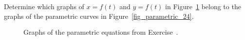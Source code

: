 
\begin{Exercise}[difficulty = 2, label = oef_match_graphs_par_eq_curves_opl] Determine which graphs of $x=f(t)$ and $y=f(t)$ in Figure~\ref{fig_parametric_23} belong to the graphs of the parametric curves in Figure~\ref{fig_parametric_24}. \label{oef_match_graphs_par_eq_curves}
    \begin{figure}[H]
    \centerline{
    \hspace{1cm}
    }
    \centerline{
    \hspace{1cm}
    }
    \caption{Graphs of the parametric equations from Exercise~\fi {}\fi. }
    \label{fig_parametric_23}
    \end{figure}
    

\end{Exercise}
